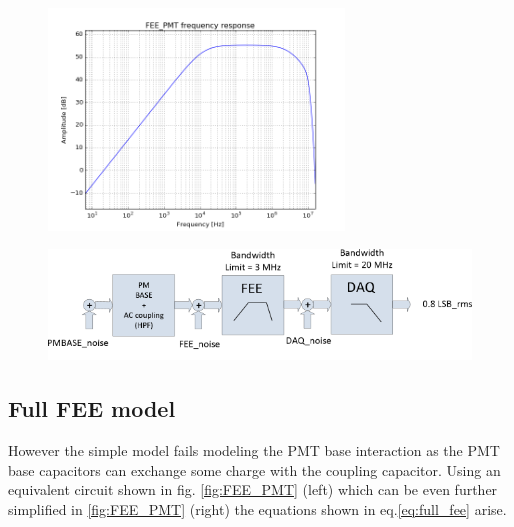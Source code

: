 \documentclass[a4paper,11pt]{report}
\begin{document}
\begin{figure}
  \begin{center}
    \includegraphics[width=0.7\textwidth]{./figures/FEEsimple_freq.png}
    \caption{}
    \label{fig:FEEsimple_freq}
  \end{center}
\end{figure}

\begin{figure}
  \begin{center}
    \includegraphics[width=\textwidth]{./figures/NOISE.png}
    \caption{}
    \label{fig:noise_eq}
  \end{center}
\end{figure}

\subsection{Full FEE model}
However the simple model fails modeling the PMT base interaction as the PMT base capacitors can exchange some charge with the coupling capacitor. Using an equivalent circuit shown in fig. \ref{fig:FEE_PMT} (left) which can be even further simplified in \ref{fig:FEE_PMT} (right) the equations shown in eq.\ref{eq:full_fee} arise. 
\end{document}
